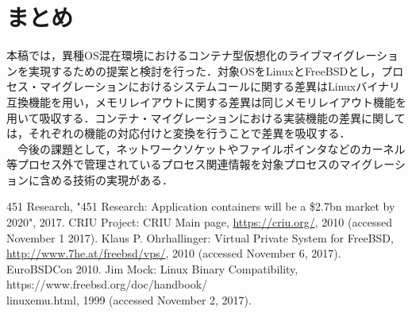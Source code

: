 \documentclass{ipsjpapers}
\begin{document}
\section{まとめ}
本稿では，異種OS混在環境におけるコンテナ型仮想化のライブマイグレーションを実現するための提案と検討を行った．対象OSをLinuxとFreeBSDとし，プロセス・マイグレーションにおけるシステムコールに関する差異はLinuxバイナリ互換機能を用い，メモリレイアウトに関する差異は同じメモリレイアウト機能を用いて吸収する．コンテナ・マイグレーションにおける実装機能の差異に関しては，それぞれの機能の対応付けと変換を行うことで差異を吸収する．\\
　今後の課題として，ネットワークソケットやファイルポインタなどのカーネル等プロセス外で管理されているプロセス関連情報を対象プロセスのマイグレーションに含める技術の実現がある．
\begin{thebibliography}{99}

  	451 Research, "451 Research: Application containers will be a \$2.7bn market by 2020", 2017.
  	CRIU Project: CRIU Main page, \url{https://criu.org/}, 2010 (accessed November 1 2017).
  Klaus P. Ohrhallinger: Virtual Private System for FreeBSD, \url{http://www.7he.at/freebsd/vps/}, 2010 (accessed November 6, 2017). EuroBSDCon 2010.
  Jim Mock: Linux Binary Compatibility, https://www.freebsd.org\slash{}doc\slash{}handbook\slash{}\\linuxemu.html, 1999 (accessed November 2, 2017).
\end{thebibliography}
\end{document}
